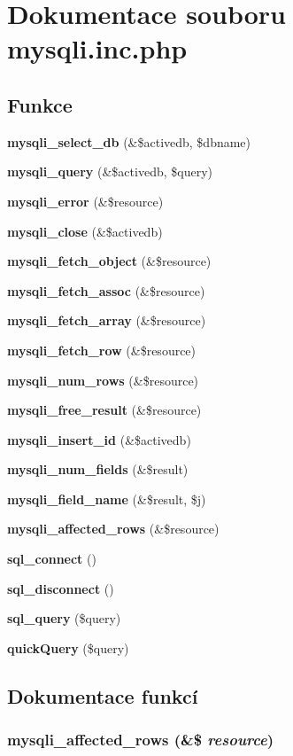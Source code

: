 \section{Dokumentace souboru mysqli.inc.php}
\label{mysqli_8inc_8php}
\subsection*{Funkce}
\begin{CompactItemize}
\item 
{\bf mysqli\_\-select\_\-db} (\&\$activedb, \$dbname)
\item 
{\bf mysqli\_\-query} (\&\$activedb, \$query)
\item 
{\bf mysqli\_\-error} (\&\$resource)
\item 
{\bf mysqli\_\-close} (\&\$activedb)
\item 
{\bf mysqli\_\-fetch\_\-object} (\&\$resource)
\item 
{\bf mysqli\_\-fetch\_\-assoc} (\&\$resource)
\item 
{\bf mysqli\_\-fetch\_\-array} (\&\$resource)
\item 
{\bf mysqli\_\-fetch\_\-row} (\&\$resource)
\item 
{\bf mysqli\_\-num\_\-rows} (\&\$resource)
\item 
{\bf mysqli\_\-free\_\-result} (\&\$resource)
\item 
{\bf mysqli\_\-insert\_\-id} (\&\$activedb)
\item 
{\bf mysqli\_\-num\_\-fields} (\&\$result)
\item 
{\bf mysqli\_\-field\_\-name} (\&\$result, \$j)
\item 
{\bf mysqli\_\-affected\_\-rows} (\&\$resource)
\item 
{\bf sql\_\-connect} ()
\item 
{\bf sql\_\-disconnect} ()
\item 
{\bf sql\_\-query} (\$query)
\item 
{\bf quickQuery} (\$query)
\end{CompactItemize}


\subsection{Dokumentace funkcí}
\subsubsection{\setlength{\rightskip}{0pt plus 5cm}mysqli\_\-affected\_\-rows (\&\$ {\em resource})}\label{mysqli_8inc_8php_8ecfc8e422ffe33ee624481d0d4c8567}


